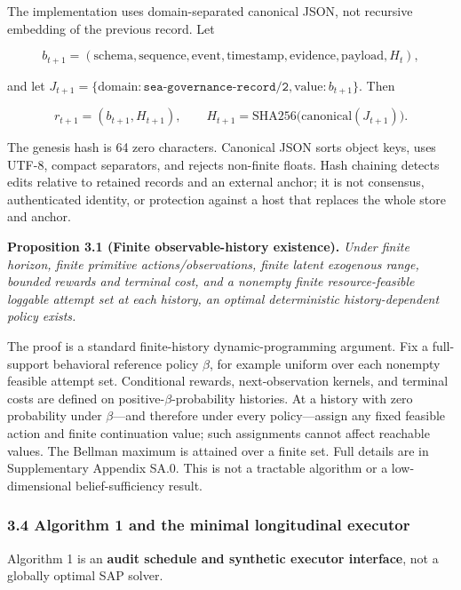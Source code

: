 \documentclass[
  11pt]{article}
\newcommand{\Needspace}[1]{%
  \par
  \ifdim\pagegoal>\pagetotal
    \ifdim\dimexpr\pagegoal-\pagetotal\relax<#1\relax
      \newpage
    \fi
  \fi
}
\begin{document}
The implementation uses domain-separated canonical JSON, not recursive
embedding of the previous record. Let

\[b_{t+1}=(\mathrm{schema},\mathrm{sequence},\mathrm{event},\mathrm{timestamp},\mathrm{evidence},\mathrm{payload},H_t),\]

and let
\(J_{t+1}=\{\mathrm{domain}:\texttt{sea-governance-record/2},\mathrm{value}:b_{t+1}\}\).
Then

\[r_{t+1}=(b_{t+1},H_{t+1}),\qquad H_{t+1}=\mathrm{SHA256}\bigl(\mathrm{canonical}(J_{t+1})\bigr).\tag{3}\]

The genesis hash is 64 zero characters. Canonical JSON sorts object
keys, uses UTF-8, compact separators, and rejects non-finite floats.
Hash chaining detects edits relative to retained records and an external
anchor; it is not consensus, authenticated identity, or protection
against a host that replaces the whole store and anchor.

\textbf{Proposition 3.1 (Finite observable-history existence).}
\emph{Under finite horizon, finite primitive actions/observations,
finite latent exogenous range, bounded rewards and terminal cost, and a
nonempty finite resource-feasible loggable attempt set at each history,
an optimal deterministic history-dependent policy exists.}

The proof is a standard finite-history dynamic-programming argument. Fix
a full-support behavioral reference policy \(\beta\), for example
uniform over each nonempty feasible attempt set. Conditional rewards,
next-observation kernels, and terminal costs are defined on
positive-\(\beta\)-probability histories. At a history with zero
probability under \(\beta\)---and therefore under every policy---assign
any fixed feasible action and finite continuation value; such
assignments cannot affect reachable values. The Bellman maximum is
attained over a finite set. Full details are in Supplementary Appendix
SA.0. This is not a tractable algorithm or a low-dimensional
belief-sufficiency result.

\Needspace{30em}

\subsubsection{3.4 Algorithm 1 and the minimal longitudinal
executor}\label{algorithm-1-and-the-minimal-longitudinal-executor}

Algorithm 1 is an \textbf{audit schedule and synthetic executor
interface}, not a globally optimal SAP solver.
\end{document}
